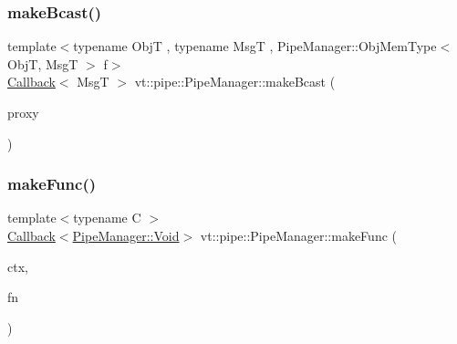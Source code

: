 \subsubsection{\texorpdfstring{make\+Bcast()}{makeBcast()}\hspace{0.1cm}{\footnotesize\ttfamily [6/6]}}
{\footnotesize\ttfamily template$<$typename ObjT , typename MsgT , Pipe\+Manager\+::\+Obj\+Mem\+Type$<$ Obj\+T, Msg\+T $>$ f$>$ \\
\hyperlink{namespacevt_a36db99df4c973d48b1118a293fff533f}{Callback}$<$ MsgT $>$ vt\+::pipe\+::\+Pipe\+Manager\+::make\+Bcast (\begin{DoxyParamCaption}\item[{\hyperlink{structvt_1_1objgroup_1_1proxy_1_1_proxy}{objgroup\+::proxy\+::\+Proxy}$<$ ObjT $>$}]{proxy }\end{DoxyParamCaption})}

\mbox{\label{structvt_1_1pipe_1_1_pipe_manager_a64be0df0367ac73feff93acdd11f9a09}} 
\subsubsection{\texorpdfstring{make\+Func()}{makeFunc()}\hspace{0.1cm}{\footnotesize\ttfamily [1/6]}}
{\footnotesize\ttfamily template$<$typename C $>$ \\
\hyperlink{namespacevt_a36db99df4c973d48b1118a293fff533f}{Callback}$<$\hyperlink{structvt_1_1pipe_1_1_pipe_manager_ab720c2580ecfd3ab36e49aeaaff64cc6}{Pipe\+Manager\+::\+Void}$>$ vt\+::pipe\+::\+Pipe\+Manager\+::make\+Func (\begin{DoxyParamCaption}\item[{C $\ast$}]{ctx,  }\item[{\hyperlink{structvt_1_1pipe_1_1_pipe_manager_base_ad8463823b6b4cfdb67c119d6d22e3bac}{Func\+Ctx\+Type}$<$ C $>$}]{fn }\end{DoxyParamCaption})}

\mbox{\label{structvt_1_1pipe_1_1_pipe_manager_a92427d0fbe9ee05aff71178147814c96}} 
